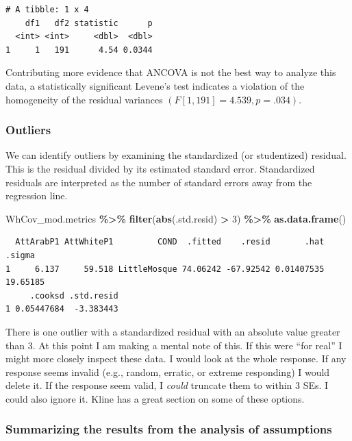 \documentclass[
  11pt,
]{book}
\newenvironment{Shaded}{\begin{snugshade}}{\end{snugshade}}
\newcommand{\DecValTok}[1]{\textcolor[rgb]{0.06,0.06,0.06}{#1}}
\newcommand{\FunctionTok}[1]{\textcolor[rgb]{0.27,0.27,0.27}{\textbf{#1}}}
\newcommand{\NormalTok}[1]{#1}
\newcommand{\SpecialCharTok}[1]{\textcolor[rgb]{0.43,0.43,0.43}{\textbf{#1}}}
\begin{document}
\begin{verbatim}
# A tibble: 1 x 4
    df1   df2 statistic      p
  <int> <int>     <dbl>  <dbl>
1     1   191      4.54 0.0344
\end{verbatim}

Contributing more evidence that ANCOVA is not the best way to analyze this data, a statistically significant Levene's test indicates a violation of the homogeneity of the residual variances \((F[1, 191] = 4.539, p = .034)\).

\hypertarget{outliers-1}{%
\subsubsection{Outliers}\label{outliers-1}}

We can identify outliers by examining the standardized (or studentized) residual. This is the residual divided by its estimated standard error. Standardized residuals are interpreted as the number of standard errors away from the regression line.

\begin{Shaded}
\begin{Highlighting}[]
\NormalTok{WhCov\_mod.metrics }\SpecialCharTok{\%\textgreater{}\%}
    \FunctionTok{filter}\NormalTok{(}\FunctionTok{abs}\NormalTok{(.std.resid) }\SpecialCharTok{\textgreater{}} \DecValTok{3}\NormalTok{) }\SpecialCharTok{\%\textgreater{}\%}
    \FunctionTok{as.data.frame}\NormalTok{()}
\end{Highlighting}
\end{Shaded}

\begin{verbatim}
  AttArabP1 AttWhiteP1         COND  .fitted    .resid       .hat   .sigma
1     6.137     59.518 LittleMosque 74.06242 -67.92542 0.01407535 19.65185
     .cooksd .std.resid
1 0.05447684  -3.383443
\end{verbatim}

There is one outlier with a standardized residual with an absolute value greater than 3. At this point I am making a mental note of this. If this were ``for real'' I might more closely inspect these data. I would look at the whole response. If any response seems invalid (e.g., random, erratic, or extreme responding) I would delete it. If the response seem valid, I \emph{could} truncate them to within 3 SEs. I could also ignore it. Kline \citeyearpar{kline_data_2016} has a great section on some of these options.

\hypertarget{summarizing-the-results-from-the-analysis-of-assumptions}{%
\subsubsection{Summarizing the results from the analysis of assumptions}\label{summarizing-the-results-from-the-analysis-of-assumptions}}
\end{document}
